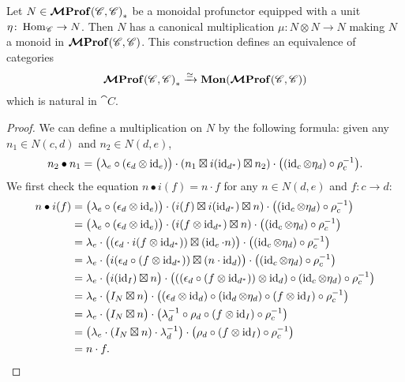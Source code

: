 \documentclass[12pt,oneside,article,draft]{memoir}
\begin{document}
\begin{proposition}\label{Prop:unit implies monoid}
   Let $N\in\bm{\mathcal{M}}\mathbf{Prof}{(\mathscr{C},\mathscr{C})}_*$ be a monoidal profunctor equipped with a unit $\eta\colon\operatorname{Hom}_{\mathscr{C}}\to N$.
   Then $N$ has a canonical multiplication $\mu\colon N\otimes N\to N$ making $N$ a monoid in $\bm{\mathcal{M}}\mathbf{Prof}(\mathscr{C},\mathscr{C})$.
   This construction defines an equivalence of categories
      \[\bm{\mathcal{M}}\mathbf{Prof}{(\mathscr{C},\mathscr{C})}_*\xrightarrow{\simeq}\mathbf{Mon}(\bm{\mathcal{M}}\mathbf{Prof}(\mathscr{C},\mathscr{C}))\]
   which is natural in $\cat{C}$.
\end{proposition}
\begin{proof}
   We can define a multiplication on $N$ by the following formula: given any $n_1\in N(c,d)$ and $n_2\in N(d,e)$,
   \[
      n_2\bullet n_1 = \bigl(\lambda_e\circ(\epsilon_d\otimes\operatorname{id}_e)\bigr)\cdot(n_1\boxtimes i(\operatorname{id}_{d^*})\boxtimes n_2)\cdot\bigl((\operatorname{id}_c\otimes \eta_d)\circ\rho_c^{-1}\bigr).
   \]
   We first check the equation $n\bullet i(f)=n\cdot f$ for any $n\in N(d,e)$ and $f\colon c\to d$:
   \begin{align*}
      n\bullet i(f) &= \bigl(\lambda_e\circ(\epsilon_d\otimes\operatorname{id}_e)\bigr)\cdot(i(f)\boxtimes i(\operatorname{id}_{d^*})\boxtimes n)\cdot\bigl((\operatorname{id}_c\otimes \eta_d)\circ\rho_c^{-1}\bigr) \\
      &= \bigl(\lambda_e\circ(\epsilon_d\otimes\operatorname{id}_e)\bigr)\cdot(i(f\otimes\operatorname{id}_{d^*})\boxtimes n)\cdot\bigl((\operatorname{id}_c\otimes \eta_d)\circ\rho_c^{-1}\bigr) \\
      &= \lambda_e\cdot\bigl((\epsilon_d\cdot i(f\otimes \operatorname{id}_{d^*}))\boxtimes (\operatorname{id}_e\cdot n)\bigr)\cdot\bigl((\operatorname{id}_c\otimes \eta_d)\circ\rho_c^{-1}\bigr) \\
      &= \lambda_e\cdot\bigl(i(\epsilon_d\circ (f\otimes \operatorname{id}_{d^*}))\boxtimes (n\cdot\operatorname{id}_d)\bigr)\cdot\bigl((\operatorname{id}_c\otimes \eta_d)\circ\rho_c^{-1}\bigr) \\
      &= \lambda_e\cdot\bigl(i(\operatorname{id}_I)\boxtimes n\bigr)\cdot\bigl(((\epsilon_d\circ (f\otimes \operatorname{id}_{d^*}))\otimes\operatorname{id}_d)\circ(\operatorname{id}_c\otimes \eta_d)\circ\rho_c^{-1}\bigr) \\
      &= \lambda_e\cdot\bigl(I_N\boxtimes n\bigr)\cdot\bigl((\epsilon_d\otimes\operatorname{id}_d)\circ(\operatorname{id}_d\otimes\eta_d)\circ(f\otimes\operatorname{id}_I)\circ\rho_c^{-1}\bigr) \\
      &= \lambda_e\cdot\bigl(I_N\boxtimes n\bigr)\cdot\bigl(\lambda_d^{-1}\circ\rho_d\circ(f\otimes\operatorname{id}_I)\circ\rho_c^{-1}\bigr) \\
      &= \bigl(\lambda_e\cdot(I_N\boxtimes n)\cdot\lambda_d^{-1}\bigr)\cdot\bigl(\rho_d\circ(f\otimes\operatorname{id}_I)\circ\rho_c^{-1}\bigr) \\
      &= n\cdot f.
   \end{align*}


\end{proof}
\end{document}
